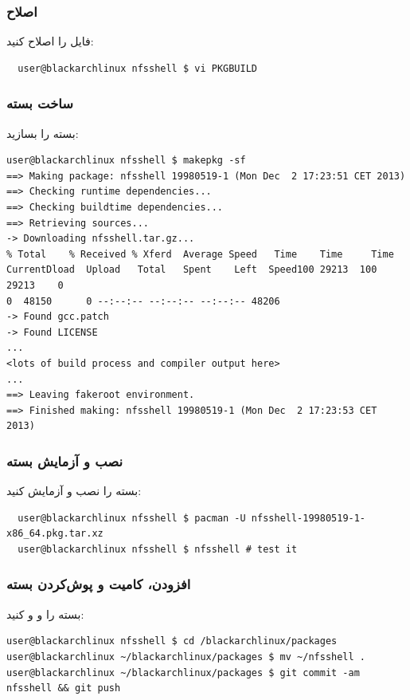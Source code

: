 \documentclass[a4paper, oneside, 11pt]{book}
\begin{document}
\subsubsection{اصلاح }
فایل \textit{} را اصلاح کنید:
\begin{latin}
\begin{lstlisting}
  user@blackarchlinux nfsshell $ vi PKGBUILD
\end{lstlisting}
\end{latin}

\subsubsection{ساخت بسته}
بسته را بسازید:
\begin{latin}
\begin{lstlisting}
user@blackarchlinux nfsshell $ makepkg -sf
==> Making package: nfsshell 19980519-1 (Mon Dec  2 17:23:51 CET 2013)
==> Checking runtime dependencies...
==> Checking buildtime dependencies...
==> Retrieving sources...
-> Downloading nfsshell.tar.gz...
% Total    % Received % Xferd  Average Speed   Time    Time     Time
CurrentDload  Upload   Total   Spent    Left  Speed100 29213  100 29213    0
0  48150      0 --:--:-- --:--:-- --:--:-- 48206
-> Found gcc.patch
-> Found LICENSE
...
<lots of build process and compiler output here>
...
==> Leaving fakeroot environment.
==> Finished making: nfsshell 19980519-1 (Mon Dec  2 17:23:53 CET 2013)
\end{lstlisting}
\end{latin}

\subsubsection{نصب و آزمایش بسته}
بسته را نصب و آزمایش کنید:
\begin{latin}
\begin{lstlisting}
  user@blackarchlinux nfsshell $ pacman -U nfsshell-19980519-1-x86_64.pkg.tar.xz
  user@blackarchlinux nfsshell $ nfsshell # test it
\end{lstlisting}
\end{latin}

\subsubsection{افزودن، کامیت و پوش‌کردن بسته}
بسته را  و  و  کنید:
\begin{latin}
\begin{lstlisting}
user@blackarchlinux nfsshell $ cd /blackarchlinux/packages
user@blackarchlinux ~/blackarchlinux/packages $ mv ~/nfsshell .
user@blackarchlinux ~/blackarchlinux/packages $ git commit -am nfsshell && git push
\end{lstlisting}
\end{latin}
\end{document}
